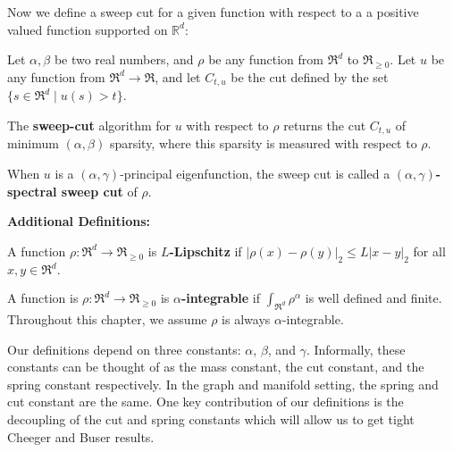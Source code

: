 Now we define a sweep cut for a given function with respect to a
a positive valued function supported on $\mathbb{R}^d$:

\vspace{2 mm}
\begin{definition} Let $\alpha, \beta$ be two real numbers, and $\rho$ be
  any function from $\Re^d$ to $\Re_{\geq 0}$.
  Let $u$ be any function from $\Re^d \to \Re$, and let $C_{t, u}$ be the cut
  defined by the set $\{s \in \Re^d \; | \; u(s) > t\}$. 
  
  The \textbf{sweep-cut} algorithm
  for $u$ with respect to $\rho$ returns the cut $C_{t,u}$ of minimum $(\alpha,
  \beta)$ sparsity, where this sparsity is measured with respect to $\rho$.

When $u$ is a $(\alpha, \gamma)$-principal eigenfunction, the sweep cut is called
a \textbf{$(\alpha, \gamma)$-spectral sweep cut} of $\rho$.  
\end{definition}

\textbf{Additional Definitions:}

A function $\rho: \Re^d \to \Re_{\geq 0}$ is
\textbf{$L$-Lipschitz} if $|\rho(x)-\rho(y)|_2 \leq L|x-y|_2$ for
all $x, y \in \Re^d.$

A function is $\rho:\Re^d \to \Re_{\geq 0}$ is
\textbf{$\alpha$-integrable} if $\int_{\Re^d} \rho^\alpha$ is
well defined and finite. Throughout this chapter, we assume $\rho$
is always $\alpha$-integrable.

\vspace{3 mm}
Our definitions depend on three constants: $\alpha$, $\beta$, and
$\gamma$. Informally, these constants can be thought of as the mass
constant, the cut constant, and the spring constant respectively. In the
graph and manifold setting, the spring and cut constant are the same. One key
contribution of our definitions is the decoupling of the cut and spring
constants which will allow us to get tight Cheeger and Buser results.


